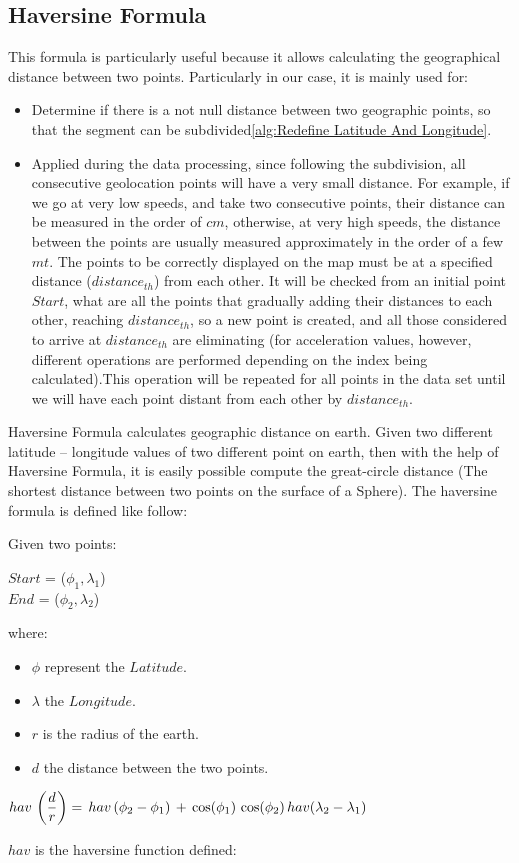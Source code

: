 \documentclass[tesi]{subfiles}
\begin{document}
\subsection{Haversine Formula} \label{ssc:Haversine Formula}
This formula is particularly useful because it allows calculating the geographical distance between two points. Particularly in our case, it is mainly used for:
\begin{itemize}
\item Determine if there is a not null distance between two geographic points, so that the segment can be subdivided\ref{alg:Redefine Latitude And Longitude}.
\item Applied during the data processing, since following the subdivision, all consecutive geolocation points will have a very small distance.
For example, if we go at very low speeds, and take two consecutive points, their distance can be measured in the order of $cm$, otherwise, at very high speeds, the distance between the points are usually measured approximately in the order of a few $mt$.
The points to be correctly displayed on the map must be at a specified distance ($distance_{th}$) from each other.
It will be checked from an initial point $Start$, what are all the points that gradually adding their distances to each other, reaching $distance_{th}$, so a new point is created, and all those considered to arrive at $distance_{th}$ are eliminating (for acceleration values, however, different operations are performed depending on the index being calculated).This operation will be repeated for all points in the data set until we will have each point distant from each other by $distance_{th}$.
\end{itemize}

\noindent Haversine Formula calculates geographic distance on earth. Given two different latitude – longitude values of two different point on earth, then with the help of Haversine Formula, it is easily possible compute the great-circle distance (The shortest distance between two points on the surface of a Sphere). 		
\noindent The haversine formula is defined like follow:

\noindent Given two points:
\begin{center}
$Start$ = ($\phi_{1} , \lambda_{1}$)\\
$End$ = ($\phi_{2} , \lambda_{2}$)
\end{center}

where:
\begin{itemize}
\item $\phi$ represent the $Latitude$.
\item $\lambda$ the $Longitude$.
\item $r$ is the radius of the earth.
\item $d$ the distance between the two points.
\end{itemize} 
\begin{center}
$ hav \thinspace \left(\dfrac{d}{r}\right) = \thinspace hav \thinspace (\phi_{2} - \phi_{1}) \thinspace + \thinspace \cos (\phi_{1}) \thinspace \cos(\phi_{2}) \thinspace hav(\lambda_{2} - \lambda_{1})$
\end{center}
$hav$ is the haversine function defined:
\end{document}
